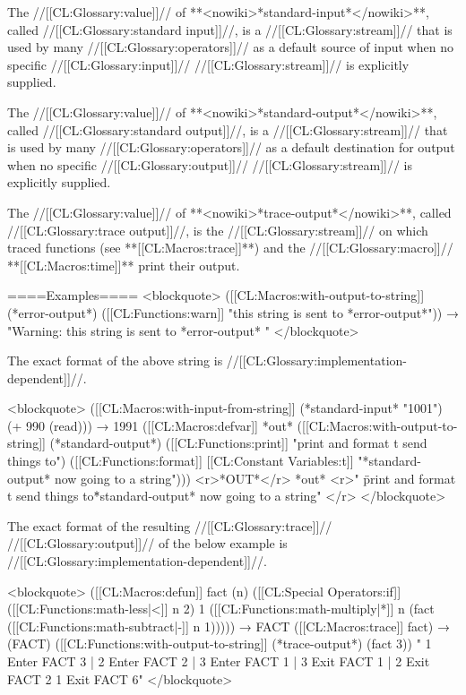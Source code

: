 The //[[CL:Glossary:value]]// of **<nowiki>*standard-input*</nowiki>**, called //[[CL:Glossary:standard input]]//, is a //[[CL:Glossary:stream]]// that is used by many //[[CL:Glossary:operators]]// as a default source of input when no specific //[[CL:Glossary:input]]// //[[CL:Glossary:stream]]// is explicitly supplied.

The //[[CL:Glossary:value]]// of **<nowiki>*standard-output*</nowiki>**, called //[[CL:Glossary:standard output]]//, is a //[[CL:Glossary:stream]]// that is used by many //[[CL:Glossary:operators]]// as a default destination for output when no specific //[[CL:Glossary:output]]// //[[CL:Glossary:stream]]// is explicitly supplied.

The //[[CL:Glossary:value]]// of **<nowiki>*trace-output*</nowiki>**, called //[[CL:Glossary:trace output]]//, is the //[[CL:Glossary:stream]]// on which traced functions (see **[[CL:Macros:trace]]**) and the //[[CL:Glossary:macro]]// **[[CL:Macros:time]]** print their output.

====Examples====
<blockquote> 
([[CL:Macros:with-output-to-string]] (*error-output*) 
  ([[CL:Functions:warn]] "this string is sent to *error-output*")) 
→ "Warning: this string is sent to *error-output* " 
</blockquote> 

The exact format of the above string is //[[CL:Glossary:implementation-dependent]]//.

<blockquote> 
([[CL:Macros:with-input-from-string]] (*standard-input* "1001") 
  (+ 990 (read))) → 1991
([[CL:Macros:defvar]] *out* 
  ([[CL:Macros:with-output-to-string]] (*standard-output*) 
    ([[CL:Functions:print]] "print and format t send things to") 
    ([[CL:Functions:format]] [[CL:Constant Variables:t]] "*standard-output* now going to a string"))) <r>*OUT*</r>
*out* <r>"
\"print and format t send things to\" *standard-output* now going to a string" </r>
</blockquote> 

The exact format of the resulting //[[CL:Glossary:trace]]// //[[CL:Glossary:output]]// of the below example is //[[CL:Glossary:implementation-dependent]]//.

<blockquote> 
([[CL:Macros:defun]] fact (n) 
  ([[CL:Special Operators:if]] ([[CL:Functions:math-less|<]] n 2) 
      1 
      ([[CL:Functions:math-multiply|*]] n (fact ([[CL:Functions:math-subtract|-]] n 1))))) → FACT 
([[CL:Macros:trace]] fact) → (FACT)  
([[CL:Functions:with-output-to-string]] (*trace-output*) 
  (fact 3)) 
" 1 Enter FACT 3 
  | 2 Enter FACT 2 
    | 3 Enter FACT 1 
    | 3 Exit FACT 1 
  | 2 Exit FACT 2 
1 Exit FACT 6"
</blockquote>

